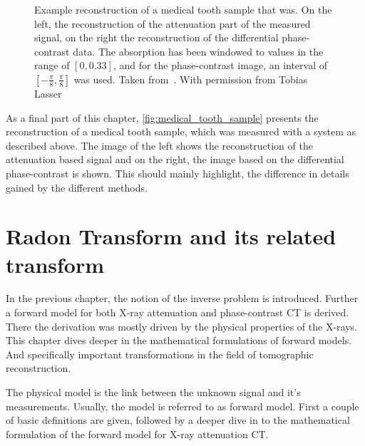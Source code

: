 \begin{figure}
	\centering
	\caption{Example reconstruction of a medical tooth sample that was. On the left, the
		reconstruction of the attenuation part of the measured signal, on the right the
		reconstruction of the differential phase-contrast data. The absorption has been
		windowed to values in the range of \([0, 0.33]\), and for the phase-contrast image,
		an interval of \([-\frac{\pi}{8}, \frac{\pi}{8}]\) was used. Taken
		from~\cite{wieczorek_anisotropic_2017}. With permission from Tobias Lasser}
	\label{fig:medical_tooth_sample}
\end{figure}

As a final part of this chapter, \autoref{fig:medical_tooth_sample} presents the reconstruction of a
medical tooth sample, which was measured with a system as described above. The image of the left
shows the reconstruction of the attenuation based signal and on the right, the image based on the
differential phase-contrast is shown. This should mainly highlight, the difference in details gained
by the different methods.

\chapter{Radon Transform and its related transform}\label{chap:radon_transform_and_related}

In the previous chapter, the notion of the inverse problem is introduced. Further a forward model
for both X-ray attenuation and phase-contrast CT is derived. There the derivation was mostly driven
by the physical properties of the X-rays. This chapter dives deeper in the mathematical formulations
of forward models. And specifically important transformations in the field of tomographic
reconstruction.

The physical model is the link between the unknown signal and it's measurements. Usually, the model
is referred to as forward model. First a couple of basic definitions are given, followed by a deeper
dive in to the mathematical formulation of the forward model for X-ray attenuation CT\@.


